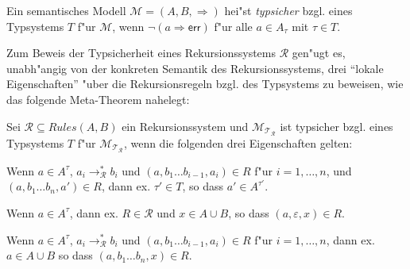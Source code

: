 \documentclass[12pt,a4paper,final]{article}
\begin{document}
\begin{definition}[Typsicherheit]
  Ein semantisches Modell \mbox{$\mathcal{M} = (A,B,\Rightarrow)$} hei"st \emph{typsicher} bzgl.\xspace
  eines Typsystems $T$ f"ur $\mathcal{M}$, wenn \mbox{$\neg(a \Rightarrow \mathsf{err})$} f"ur
  alle \mbox{$a \in A_\tau$} mit \mbox{$\tau \in T$}.
\end{definition}

Zum Beweis der Typsicherheit eines Rekursionssystems $\mathcal{R}$ gen"ugt es, unabh"angig von
der konkreten Semantik des Rekursionssystems, drei ``lokale Eigenschaften'' "uber die Rekursionsregeln
bzgl.\xspace des Typsystems zu beweisen, wie das folgende Meta-Theorem nahelegt:

\begin{theorem}[Typsicherheit]
  Sei \mbox{$\mathcal{R} \subseteq \mathit{Rules}(A,B)$} ein Rekursionssystem und
  \mbox{$\mathcal{M}_{\mathcal{T}_{\mathcal{R}}}$} ist typsicher bzgl.\xspace
  eines Typsystems $T$ f"ur \mbox{$\mathcal{M}_{\mathcal{T}_{\mathcal{R}}}$}, wenn
  die folgenden drei Eigenschaften gelten:
  \begin{description}[labelindent=\parindent,style=nextline]
  \item[Local Preservation] 
    Wenn \mbox{$a \in A^\tau$},
    \mbox{$a_i \rightarrow_{\mathcal{R}}^* b_i$} und \mbox{$(a,b_1 \ldots b_{i-1},a_i) \in R$} f"ur
    \mbox{$i=1,\ldots,n$}, und \mbox{$(a,b_1 \ldots b_n,a') \in R$}, dann ex. \mbox{$\tau' \in T$},
    so dass \mbox{$a' \in A^{\tau'}$}.
    
  \item[Local Progress I]
    Wenn \mbox{$a \in A^\tau$},
    dann ex. \mbox{$R \in \mathcal{R}$} und \mbox{$x \in A \cup B$}, so dass \mbox{$(a,\varepsilon,x) \in R$}.

  \item[Local Progress II]
    Wenn \mbox{$a \in A^\tau$},
    \mbox{$a_i \rightarrow_{\mathcal{R}}^* b_i$} und \mbox{$(a,b_1 \ldots b_{i-1},a_i) \in R$} f"ur
    \mbox{$i=1,\ldots,n$}, dann ex. \mbox{$a \in A \cup B$} so dass \mbox{$(a,b_1 \ldots b_n,x) \in R$}.
  \end{description}
\end{theorem}




\end{document}
